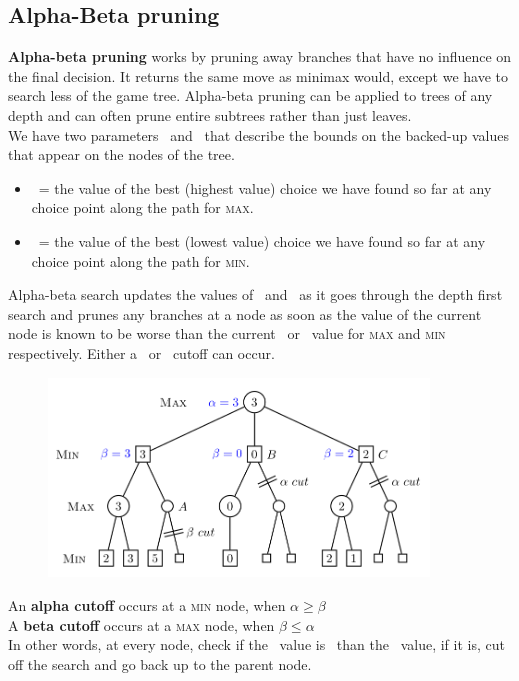 \documentclass{article}
\newcommand{\n}[0]{\\[\baselineskip]}
\begin{document}
\subsection{Alpha-Beta pruning}
\textbf{Alpha-beta pruning} works by pruning away branches that have no influence on the final decision. It returns the same move as minimax would, except we have to search less of the game tree. Alpha-beta pruning can be applied to trees of any depth and can often prune entire subtrees rather than just leaves.
\n
We have two parameters \alpha\ and \beta\ that describe the bounds on the backed-up values that appear on the nodes of the tree.
\begin{itemize}
\item \alpha\ = the value of the best (highest value) choice we have found so far at any choice point along the path for \textsc{max}.
\item \beta\ = the value of the best (lowest value) choice we have found so far at any choice point along the path for \textsc{min}.
\end{itemize}
Alpha-beta search updates the values of \alpha\ and \beta\ as it goes through the depth first search and prunes any branches at a node as soon as the value of the current node is known to be worse than the current \alpha\ or \beta\ value for \textsc{max} and \textsc{min} respectively. Either a \alpha\ or \beta\ cutoff can occur.
\begin{figure}[H]
\centering
\includegraphics[width=0.9\textwidth, keepaspectratio]{imgs/alphabeta.png}
\end{figure}
\noindent
An \textbf{alpha cutoff} occurs at a \textsc{min} node, when $\alpha \geq \beta$ \\
A \textbf{beta cutoff} occurs at a \textsc{max} node, when $\beta \leq \alpha$
\n
In other words, at every node, check if the \alpha\ value is \geq\ than the \beta\ value, if it is, cut off the search and go back up to the parent node.
\end{document}
